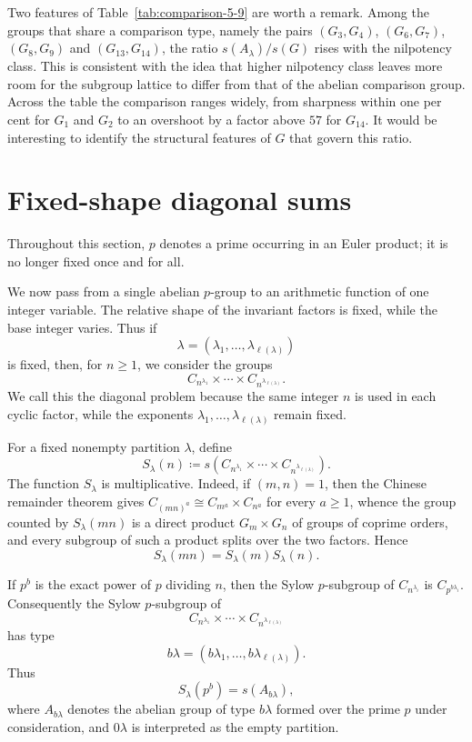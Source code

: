 \documentclass[a4paper,11pt,reqno]{amsart}
\theoremstyle{plain}
\theoremstyle{remark}
\numberwithin{equation}{section}
\renewcommand{\geq}{\geqslant}
\begin{document}
Two features of Table~\ref{tab:comparison-5-9} are worth a remark. Among the
groups that share a comparison type, namely the pairs $(G_3,G_4)$,
$(G_6,G_7)$, $(G_8,G_9)$ and $(G_{13},G_{14})$, the ratio
$s(A_\lambda)/s(G)$ rises with the nilpotency class. This is consistent with
the idea that higher nilpotency class leaves more room for the subgroup lattice
to differ from that of the abelian comparison group. Across the table the
comparison ranges widely, from sharpness within one per cent for $G_1$ and
$G_2$ to an overshoot by a factor above $57$ for $G_{14}$. It would be
interesting to identify the structural features of $G$ that govern this ratio.

\FloatBarrier

\section{Fixed-shape diagonal sums}
\label{sec:diagonal-sums}

Throughout this section, $p$ denotes a prime occurring in an Euler product; it
is no longer fixed once and for all.

We now pass from a single abelian $p$-group to an arithmetic function of one
integer variable. The relative shape of the invariant factors is fixed, while
the base integer varies. Thus if
\[
        \lambda=(\lambda_1,\ldots,\lambda_{\ell(\lambda)})
\]
is fixed, then, for $n\geq 1$, we consider the groups
\[
        C_{n^{\lambda_1}}\times\cdots\times C_{n^{\lambda_{\ell(\lambda)}}}.
\]
We call this the diagonal problem because the same integer $n$ is used in each
cyclic factor, while the exponents
$\lambda_1,\ldots,\lambda_{\ell(\lambda)}$ remain fixed.

For a fixed nonempty partition $\lambda$, define
\[
        S_\lambda(n)\coloneqq
        s(C_{n^{\lambda_1}}\times\cdots\times C_{n^{\lambda_{\ell(\lambda)}}}).
\]
The function $S_\lambda$ is multiplicative. Indeed, if $(m,n)=1$, then the
Chinese remainder theorem gives
$C_{(mn)^a}\cong C_{m^a}\times C_{n^a}$ for every $a\geq 1$, whence the group
counted by $S_\lambda(mn)$ is a direct product $G_m\times G_n$ of groups of
coprime orders, and every subgroup of such a product splits over the two
factors. Hence
\[
        S_\lambda(mn)=S_\lambda(m)S_\lambda(n).
\]


If $p^b$ is the exact power of $p$ dividing $n$, then the Sylow $p$-subgroup
of $C_{n^{\lambda_i}}$ is $C_{p^{b\lambda_i}}$. Consequently the Sylow
$p$-subgroup of
\[
        C_{n^{\lambda_1}}\times\cdots\times C_{n^{\lambda_{\ell(\lambda)}}}
\]
has type
\[
        b\lambda=(b\lambda_1,\ldots,b\lambda_{\ell(\lambda)}).
\]
Thus
\[
        S_\lambda(p^b)=s(A_{b\lambda}),
\]
where $A_{b\lambda}$ denotes the abelian group of type $b\lambda$ formed over
the prime $p$ under consideration, and $0\lambda$ is interpreted as the empty
partition.
\end{document}
